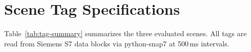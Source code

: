
\section{Scene Tag Specifications}
\label{sec:appendix-tags}

Table~\ref{tab:tag-summary} summarizes the three evaluated scenes. All tags are read from Siemens S7 data blocks via python-snap7 at 500\,ms intervals.

\begin{table}[!t]
\centering
\caption{PLC tag summary for each evaluated scene.}
\label{tab:tag-summary}
\small
{}
\end{table}

